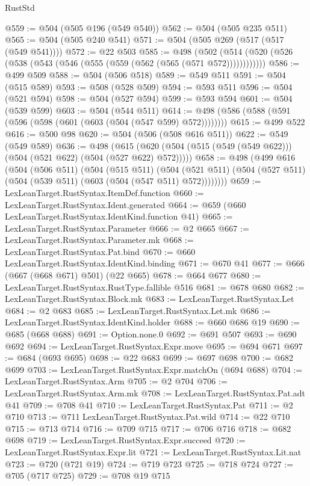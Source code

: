 \begin{lexlean}{RustStd}
\begin{coremodule}
@559 := @504 (@505 @196 (@549 @540))
@562 := @504 (@505 @235 @511)
@565 := @504 (@505 @240 @541)
@571 := @504 (@505 @269 (@517 (@517 (@549 @541))))
@572 := @22 @503
@585 := @498
    (@502 (@514 (@520 (@526 (@538 (@543 (@546 (@555 (@559 (@562 (@565 (@571 @572))))))))))))
@586 := @499 @509
@588 := @504 (@506 @518)
@589 := @549 @511
@591 := @504 (@515 @589)
@593 := @508 (@528 @509)
@594 := @593 @511
@596 := @504 (@521 @594)
@598 := @504 (@527 @594)
@599 := @593 @594
@601 := @504 (@539 @599)
@603 := @504 (@544 @511)
@614 := @498 (@586 (@588 (@591 (@596 (@598 (@601 (@603 (@504 (@547 @599) @572))))))))
@615 := @499 @522
@616 := @500 @98
@620 := @504 (@506 (@508 @616 @511))
@622 := @549 (@549 @589)
@636 := @498
    (@615 (@620 (@504 (@515 (@549 (@549 @622))) (@504 (@521 @622) (@504 (@527 @622) @572)))))
@658 := @498
    (@499
      @616
      (@504
        (@506 @511)
        (@504
          (@515 @511)
          (@504 (@521 @511) (@504 (@527 @511) (@504 (@539 @511) (@603 (@504 (@547 @511) @572))))))))
@659 := LexLeanTarget.RustSyntax.ItemDef.function
@660 := LexLeanTarget.RustSyntax.Ident.generated
@664 := @659 (@660 LexLeanTarget.RustSyntax.IdentKind.function @41)
@665 := LexLeanTarget.RustSyntax.Parameter
@666 := @2 @665
@667 := LexLeanTarget.RustSyntax.Parameter.mk
@668 := LexLeanTarget.RustSyntax.Pat.bind
@670 := @660 LexLeanTarget.RustSyntax.IdentKind.binding
@671 := @670 @41
@677 := @666 (@667 (@668 @671) @501) (@22 @665)
@678 := @664 @677
@680 := LexLeanTarget.RustSyntax.RustType.fallible @516
@681 := @678 @680
@682 := LexLeanTarget.RustSyntax.Block.mk
@683 := LexLeanTarget.RustSyntax.Let
@684 := @2 @683
@685 := LexLeanTarget.RustSyntax.Let.mk
@686 := LexLeanTarget.RustSyntax.IdentKind.holder
@688 := @660 @686 @19
@690 := @685 (@668 @688)
@691 := Option.none.{0}
@692 := @691 @507
@693 := @690 @692
@694 := LexLeanTarget.RustSyntax.Expr.move
@695 := @694 @671
@697 := @684 (@693 @695)
@698 := @22 @683
@699 := @697 @698
@700 := @682 @699
@703 := LexLeanTarget.RustSyntax.Expr.matchOn (@694 @688)
@704 := LexLeanTarget.RustSyntax.Arm
@705 := @2 @704
@706 := LexLeanTarget.RustSyntax.Arm.mk
@708 := LexLeanTarget.RustSyntax.Pat.adt @41
@709 := @708 @41
@710 := LexLeanTarget.RustSyntax.Pat
@711 := @2 @710
@713 := @711 LexLeanTarget.RustSyntax.Pat.wild
@714 := @22 @710
@715 := @713 @714
@716 := @709 @715
@717 := @706 @716
@718 := @682 @698
@719 := LexLeanTarget.RustSyntax.Expr.succeed
@720 := LexLeanTarget.RustSyntax.Expr.lit
@721 := LexLeanTarget.RustSyntax.Lit.nat
@723 := @720 (@721 @19)
@724 := @719 @723
@725 := @718 @724
@727 := @705 (@717 @725)
@729 := @708 @19 @715

\end{coremodule}
\end{lexlean}
